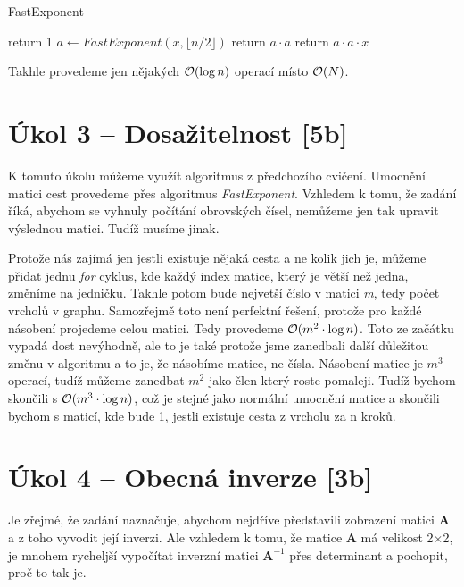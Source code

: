 \documentclass{../../../ksp}
\begin{document}
\begin{algorithm*}
    \caption{FastExponent}
    \begin{algorithmic}
                \State return 1
            \EndIf
            \State $a \gets FastExponent(x, \lfloor n/2 \rfloor)$
                \State return $a \cdot a$
            \Else
                \State return $a \cdot a \cdot x$
            \EndIf
    \end{algorithmic}
\end{algorithm*}

Takhle provedeme jen nějakých $\mathcal{O}(\log n)$ operací místo $\mathcal{O}(N)$.

\section*{Úkol 3 – Dosažitelnost [5b]}

K tomuto úkolu můžeme využít algoritmus z předchozího cvičení.
Umocnění matici cest provedeme přes algoritmus \emph{FastExponent}.
Vzhledem k tomu, že zadání říká, abychom se vyhnuly počítání obrovských čísel, nemůžeme jen tak upravit výslednou matici.
Tudíž musíme jinak.

Protože nás zajímá jen jestli existuje nějaká cesta a ne kolik jich je,
můžeme přidat jednu \emph{for} cyklus, kde každý index matice, který je větší než jedna, změníme na jedničku.
Takhle potom bude nejvetší číslo v matici \emph{m}, tedy počet vrcholů v graphu.
Samozřejmě toto není perfektní řešení, protože pro každé násobení projedeme celou matici.
Tedy provedeme $\mathcal{O}(m^2 \cdot \log n )$. Toto ze začátku vypadá dost nevýhodně,
ale to je také protože jsme zanedbali další důležitou změnu v algoritmu a to je, že násobíme matice, ne čísla.
Násobení matice je $m^3$ operací, tudíž můžeme zanedbat $m^2$ jako člen který roste pomaleji.
Tudíž bychom skončili s $\mathcal{O}(m^3 \cdot \log n)$, což je stejné jako normální umocnění matice
a skončili bychom s maticí, kde bude 1, jestli existuje cesta z vrcholu za n kroků.

\section*{Úkol 4 – Obecná inverze [3b]}

Je zřejmé, že zadání naznačuje, abychom nejdříve představili zobrazení matici \textbf{A}
a z toho vyvodit její inverzi. Ale vzhledem k tomu, že matice \textbf{A} má velikost 2$\times$2,
je mnohem rycheljší vypočítat inverzní matici $\mathbf{A}^{-1}$ přes determinant a pochopit, proč to tak je.
\end{document}
